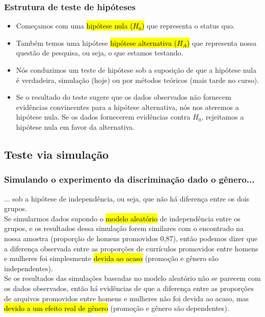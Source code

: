 
\begin{frame}
\frametitle{Estrutura de teste de hipóteses}

\begin{itemize}
\justifying
\item Começamos com uma \hl {hipótese nula ($ H_0 $)} que representa o status quo.
\justifying
\item Também temos uma hipótese \hl {hipótese alternativa ($ H_A $)} que representa nossa questão de pesquisa, ou seja, o que estamos testando.
\justifying
\item Nós conduzimos um teste de hipótese sob a suposição de que a hipótese nula é verdadeira, simulação (hoje) ou por métodos teóricos (mais tarde no curso).
\justifying
\item Se o resultado do teste sugere que os dados observados não fornecem evidências convincentes para a hipótese alternativa, nós nos ateremos a hipótese nula. Se os dados fornecerem evidências contra $H_0$, rejeitamos a hipótese nula em favor da alternativa.

\end{itemize}

\end{frame}


\subsection{Teste via simulação}


\begin{frame}
\frametitle{Simulando o experimento da discriminação dado o gênero...}
\justifying
... sob a hipótese de independência, ou seja, que não há diferença entre os dois grupos. \\

\justifying
Se simularmos dados supondo o \hl{modelo aleatório} de independência entre os grupos, e os resultados dessa simulação forem similares com o encontrado na nossa amostra (proporção de homens promovidos 0,87), então podemos dizer que a diferença observada entre as proporções de currículos promovidos entre homens e mulheres foi simplesmente \hl{devida ao acaso} (promoção e gênero são independentes). \\

\justifying
Se os resultados das simulações baseadas no modelo aleatório não se parecem com os dados observados, então há evidências de que a diferença entre as proporções de arquivos promovidos entre homens e mulheres não foi devida ao acaso, mas \hl{devido a um efeito real de gênero} (promoção e gênero são dependentes).

\end{frame}

